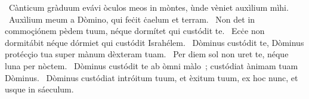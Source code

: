 {~Cànticum gràduum}
{%
evávi òculos meos in mòntes, ùnde vèniet auxìlium mìhi.
~Auxìlium meum a Dòmino, qui feċit ċaelum et terram.
~Non det in commoçiónem pèdem tuum, néque dormítet qui custódit te.
~Ecċe non dormitábit néque dórmiet qui custódit Israhélem.
~Dòminus custódit te, Dòminus protécçio tua super mànum dèxteram tuam.
~Per diem sol non uret te, néque luna per nòctem.
~Dòminus custódit te ab òmni màlo~; custódiat ànimam tuam Dòminus.
~Dòminus custódiat intróitum tuum, et èxitum tuum, ex hoc nunc, et usque in sáeculum.}
